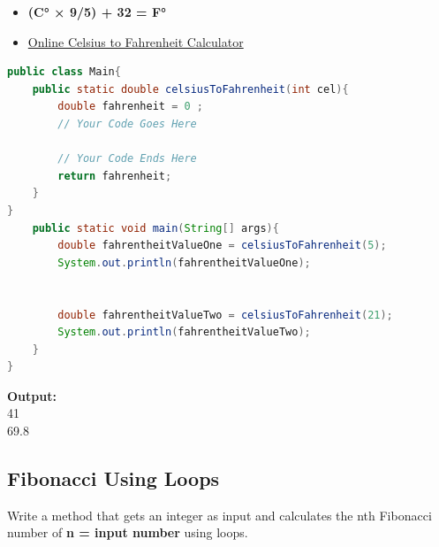 \documentclass[12pt , a4paper]{article}
\begin{document}

	\begin{importantBox}

		\begin{itemize}
			\item  \textbf{(C° × 9/5) + 32 = F°}
			\item \href{https://www.google.com/search?q=celcius+to+farenheit&oq=celcius&aqs=chrome.0.69i59j69i57j46i10i199i465i512j0i10l6j0i271.1004j0j4&sourceid=chrome&ie=UTF-8}{Online Celsius to Fahrenheit Calculator}
		\end{itemize}
	\end{importantBox}
	\begin{lstlisting}[language=Java]
public class Main{
	public static double celsiusToFahrenheit(int cel){
		double fahrenheit = 0 ;
		// Your Code Goes Here

		// Your Code Ends Here	
		return fahrenheit;
	}
}
	public static void main(String[] args){
		double fahrentheitValueOne = celsiusToFahrenheit(5);
		System.out.println(fahrentheitValueOne);

		
		double fahrentheitValueTwo = celsiusToFahrenheit(21);
		System.out.println(fahrentheitValueTwo);		
	}
}
	\end{lstlisting}


	\begin{tcolorbox}
	\textbf{Output:}\\
	41\\
	69.8
	\end{tcolorbox}

	\newpage
	\subsection{Fibonacci Using Loops}
Write a method that gets an integer as input and calculates the nth Fibonacci number of \textbf {n = input number} using loops.\\
\end{document}
